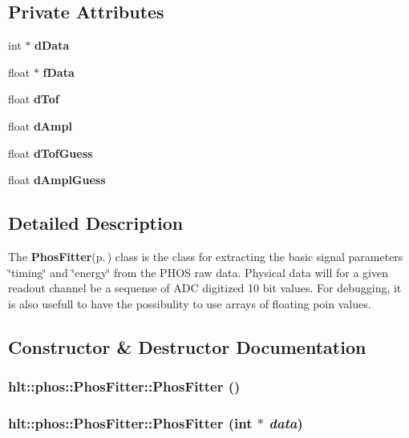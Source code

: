 \subsection*{Private Attributes}
\begin{CompactItemize}
\item 
int $\ast$ {\bf d\-Data}
\item 
float $\ast$ {\bf f\-Data}
\item 
float {\bf d\-Tof}
\item 
float {\bf d\-Ampl}
\item 
float {\bf d\-Tof\-Guess}
\item 
float {\bf d\-Ampl\-Guess}
\end{CompactItemize}


\subsection{Detailed Description}
The {\bf Phos\-Fitter}{\rm (p.\,\pageref{classhlt_1_1phos_1_1PhosFitter})} class is the class for extracting the basic signal parameters \char`\"{}timing\char`\"{} and \char`\"{}energy\char`\"{} from the PHOS raw data. Physical data will for a given readout channel be a sequense of ADC digitized 10 bit values. For debugging, it is also usefull to have the possibulity to use arrays of floating poin values. 



\subsection{Constructor \& Destructor Documentation}
\subsubsection{\setlength{\rightskip}{0pt plus 5cm}hlt::phos::Phos\-Fitter::Phos\-Fitter ()}\label{classhlt_1_1phos_1_1PhosFitter_a0}


\subsubsection{\setlength{\rightskip}{0pt plus 5cm}hlt::phos::Phos\-Fitter::Phos\-Fitter (int $\ast$ {\em data})}\label{classhlt_1_1phos_1_1PhosFitter_a1}


